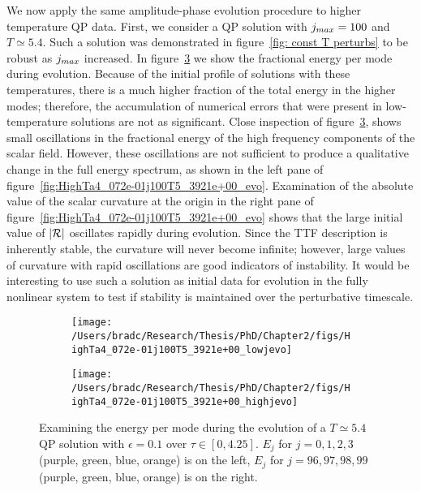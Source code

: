 \documentclass[../PhD.tex]{subfiles}
\begin{document}
We now apply the same amplitude-phase evolution procedure to higher temperature QP data. First, we consider a QP solution with $j_{max} = 100$ and $T \simeq 5.4$. Such a solution was demonstrated in figure~\ref{fig: const T perturbs} to be robust as $j_{max}$ increased. In figure~\ref{fig: HighTa4_072e-01j100T5_3921e+00_highjevo} we show  the fractional energy per mode during evolution. Because of the initial profile of solutions with these temperatures, there is a much higher fraction of the total energy in the higher modes; therefore, the accumulation of numerical errors that were present in low-temperature solutions are not as significant. Close inspection of figure~\ref{fig: HighTa4_072e-01j100T5_3921e+00_highjevo}, shows small oscillations in the fractional energy of the high frequency components of the scalar field. However, these oscillations are not sufficient to produce a qualitative change in the full energy spectrum, as shown in the left pane of figure~\ref{fig:HighTa4_072e-01j100T5_3921e+00_evo}. Examination of the absolute value of the scalar curvature at the origin in the right pane of figure~\ref{fig:HighTa4_072e-01j100T5_3921e+00_evo} shows that the large initial value of $| \mathcal R |$ oscillates rapidly during evolution. Since the TTF description is inherently stable, the curvature will never become infinite; however, large values of curvature with rapid oscillations are good indicators of instability. It would be interesting to use such a solution as initial data for evolution in the fully nonlinear system to test if stability is maintained over the perturbative timescale. 
\vspace{0.1in}
\begin{figure}[H]
	\centering
	\begin{subfigure}[t]{0.48\textwidth}
		\texttt{[image: /Users/bradc/Research/Thesis/PhD/Chapter2/figs/HighTa4\_072e-01j100T5\_3921e+00\_lowjevo]}
		\label{}
	\end{subfigure}
	\hfill
	\begin{subfigure}[t]{0.48\textwidth}
		\texttt{[image: /Users/bradc/Research/Thesis/PhD/Chapter2/figs/HighTa4\_072e-01j100T5\_3921e+00\_highjevo]}
		\label{}
	\end{subfigure}
	\caption[Examining the energy per mode during the evolution of a $T \simeq 5.4$ QP solution]{Examining the energy per mode during the evolution of a $T \simeq 5.4$ QP solution with ${\epsilon = 0.1}$ over ${\tau \in [0, 4.25]}$. $E_j$ for ${j = 0, 1, 2, 3}$ (purple, green, blue, orange) is on the left,  $E_j$ for ${j = 96, 97, 98, 99}$ (purple, green, blue, orange) is on the right.}
	\label{fig: HighTa4_072e-01j100T5_3921e+00_highjevo}
\end{figure}
	
\end{document}
